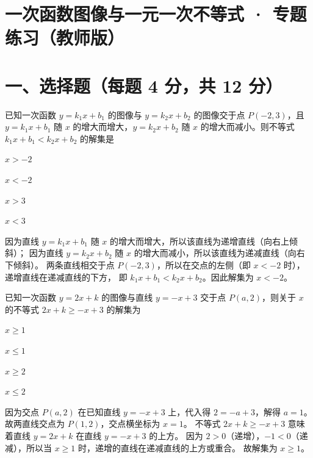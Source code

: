 \documentclass{exam-zh}
\begin{document}
\section*{一次函数图像与一元一次不等式 · 专题练习（教师版）}

\section*{一、选择题（每题 4 分，共 12 分）}


\begin{question}[points=4]
  已知一次函数 $y = k_1x + b_1$ 的图像与 $y = k_2x + b_2$ 的图像交于点 $P(-2, 3)$，且 $y = k_1x + b_1$ 随 $x$ 的增大而增大，$y = k_2x + b_2$ 随 $x$ 的增大而减小。则不等式 $k_1x + b_1 < k_2x + b_2$ 的解集是
  \begin{choices}
    \item $x > -2$
    \item $x < -2$
    \item $x > 3$
    \item $x < 3$
  \end{choices}
  \paren[B]
  \begin{solutionblock}
    因为直线 $y = k_1x + b_1$ 随 $x$ 的增大而增大，所以该直线为递增直线（向右上倾斜）；
因为直线 $y = k_2x + b_2$ 随 $x$ 的增大而减小，所以该直线为递减直线（向右下倾斜）。
两条直线相交于点 $P(-2, 3)$，所以在交点的左侧（即 $x < -2$ 时），递增直线在递减直线的下方，
即 $k_1x + b_1 < k_2x + b_2$。因此解集为 $x < -2$。

  \end{solutionblock}
\end{question}



\begin{question}[points=4]
  已知一次函数 $y = 2x + k$ 的图像与直线 $y = -x + 3$ 交于点 $P(a, 2)$，则关于 $x$ 的不等式 $2x + k \ge -x + 3$ 的解集为
  \begin{choices}
    \item $x \ge 1$
    \item $x \le 1$
    \item $x \ge 2$
    \item $x \le 2$
  \end{choices}
  \paren[A]
  \begin{solutionblock}
    因为交点 $P(a, 2)$ 在已知直线 $y = -x + 3$ 上，代入得 $2 = -a + 3$，解得 $a = 1$。
故两直线交点为 $P(1, 2)$，交点横坐标为 $x = 1$。
不等式 $2x + k \ge -x + 3$ 意味着直线 $y = 2x + k$ 在直线 $y = -x + 3$ 的上方。
因为 $2 > 0$（递增），$-1 < 0$（递减），所以当 $x \ge 1$ 时，递增的直线在递减直线的上方或重合。
故解集为 $x \ge 1$。

  \end{solutionblock}
\end{question}
\end{document}
